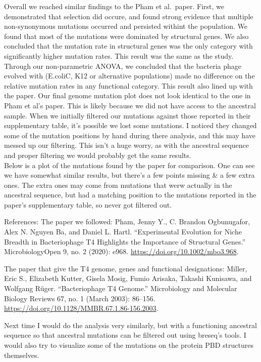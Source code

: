 \documentclass[
]{article}
\begin{document}
Overall we reached similar findings to the Pham et al.~paper. First, we
demonstrated that selection did occure, and found strong evidence that
multiple non-synonymous mutations occurred and persisted withint the
population. We found that most of the mutations were dominated by
structural genes. We also concluded that the mutation rate in structural
genes was the only category with significantly higher mutation rates.
This result was the same as the study. Through our non-parametric ANOVA,
we concluded that the bacteria phage evolved with (E.coliC, K12 or
alternative populations) made no difference on the relative mutation
rates in any functional category. This result also lined up with the
paper. Our final genome mutation plot does not look identical to the one
in Pham et al's paper. This is likely because we did not have access to
the ancestral sample. When we initially filtered our mutations against
those reported in their supplementary table, it's possible we lost some
mutations. I noticed they changed some of the mutation positions by hand
during there analysis, and this may have messed up our filtering. This
isn't a huge worry, as with the ancestral sequence and proper filtering
we would probably get the same results.\\
Below is a plot of the mutations found by the paper for comparison. One
can see we have somewhat similar results, but there's a few points
missing \& a few extra ones. The extra ones may come from mutations that
werw actually in the ancestral sequence, but had a matching position to
the mutations reported in the paper's supplementary table, so never got
filtered out.

References: The paper we followed: Pham, Jenny Y., C. Brandon
Ogbunugafor, Alex N. Nguyen Ba, and Daniel L. Hartl. ``Experimental
Evolution for Niche Breadth in Bacteriophage T4 Highlights the
Importance of Structural Genes.'' MicrobiologyOpen 9, no. 2 (2020):
e968. \url{https://doi.org/10.1002/mbo3.968}.

The paper that give the T4 genome, genes and functional designations:
Miller, Eric S., Elizabeth Kutter, Gisela Mosig, Fumio Arisaka, Takashi
Kunisawa, and Wolfgang Rüger. ``Bacteriophage T4 Genome.'' Microbiology
and Molecular Biology Reviews 67, no. 1 (March 2003): 86--156.
\url{https://doi.org/10.1128/MMBR.67.1.86-156.2003}.

Next time I would do the analysis very similarly, but with a functioning
ancestral sequence so that ancestral mutations can be filtered out using
breseq's tools. I would also try to visualize some of the mutations on
the protein PBD structures themselves.
\end{document}
